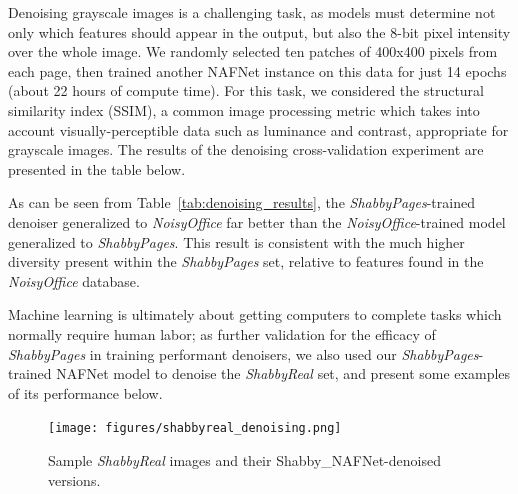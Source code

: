 \documentclass[runningheads]{llncs}
\begin{document}
Denoising grayscale images is a challenging task, as models must determine not only which features should appear in the output, but also the 8-bit pixel intensity over the whole image.
We randomly selected ten patches of 400x400 pixels from each page, then trained another NAFNet instance on this data for just 14 epochs (about 22 hours of compute time).
For this task, we considered the structural similarity index (SSIM), a common image processing metric which takes into account visually-perceptible data such as luminance and contrast, appropriate for grayscale images.
The results of the denoising cross-validation experiment are presented in the table below.

\begin{table}[]
    \centering
    \caption{Document image denoising cross-test performance of NAFNet models trained on \emph{ShabbyPages} and \emph{NoisyOffice}.} \label{tab:denoising_results}
\end{table}

As can be seen from Table~\ref{tab:denoising_results}, the \emph{ShabbyPages}-trained denoiser generalized to \emph{NoisyOffice} far better than the \emph{NoisyOffice}-trained model generalized to \emph{ShabbyPages}. This result is consistent with the much higher diversity present within the \emph{ShabbyPages} set, relative to features found in the \emph{NoisyOffice} database.

Machine learning is ultimately about getting computers to complete tasks which normally require human labor; as further validation for the efficacy of \emph{ShabbyPages} in training performant denoisers, we also used our \emph{ShabbyPages}-trained NAFNet model to denoise the \emph{ShabbyReal} set, and present some examples of its performance below.

\begin{figure}
\centering
\texttt{[image: figures/shabbyreal\_denoising.png]}
\caption{Sample \emph{ShabbyReal} images and their Shabby\_NAFNet-denoised versions.}
\label{fig:shabbyreal_denoising}
\end{figure}
\end{document}
